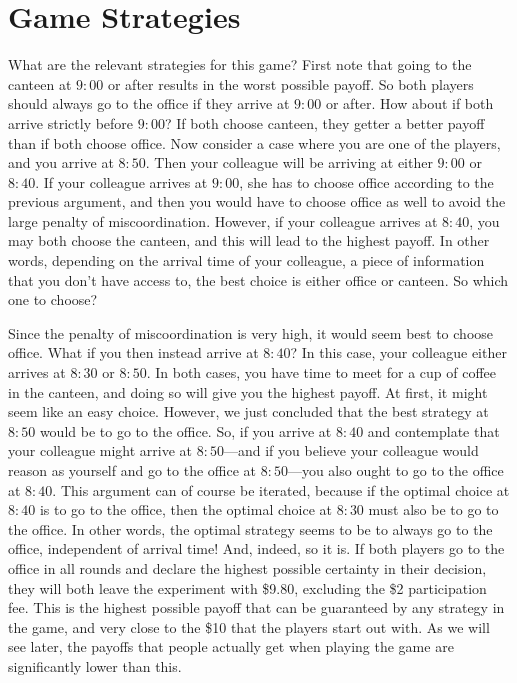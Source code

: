 \documentclass[twocolumn,a4paper,superscriptaddress,nofootinbib]{revtex4}
\begin{document}
\section{Game Strategies}
What are the relevant strategies for this game? First note that going to the canteen at $9{:}00$ or after results in the worst possible payoff. So both players should always go to the office if they arrive at $9{:}00$ or after. How about if both arrive strictly before $9{:}00$? If both choose canteen, they getter a better payoff than if both choose office. Now consider a case where you are one of the players, and you arrive at $8{:}50$. Then your colleague will be arriving at either $9{:}00$ or $8{:}40$. If your colleague arrives at $9{:}00$, she has to choose office according to the previous argument, and then you would have to choose office as well to avoid the large penalty of miscoordination. However, if your colleague arrives at $8{:}40$, you may both choose the canteen, and this will lead to the highest payoff. In other words, depending on the arrival time of your colleague, a piece of information that you don't have access to, the best choice is either office or canteen. So which one to choose?

Since the penalty of miscoordination is very high, it would seem best to choose office. What if you then instead  arrive at $8{:}40$? In this case, your colleague either arrives at $8{:}30$ or $8{:}50$. In both cases, you have time to meet for a cup of coffee in the canteen, and doing so will give you the highest payoff. At first, it might seem like an easy choice. However, we just concluded that the best strategy at $8{:}50$ would be to go to the office. So, if you arrive at $8{:}40$ and contemplate that your colleague might arrive at $8{:}50$---and if you believe your colleague would reason as yourself and go to the office at $8{:}50$---you also ought to go to the office at $8{:}40$. This argument can of course be iterated, because if the optimal choice at $8{:}40$ is to go to the office, then the optimal choice at $8{:}30$ must also be to go to the office. In other words, the optimal strategy seems to be to always go to the office, independent of arrival time! And, indeed, so it is. If both players go to the office in all rounds and declare the highest possible certainty in their decision, they will both leave the experiment with \$9.80, excluding the \$2 participation fee. This is the highest possible payoff that can be guaranteed by any strategy in the game, and very close to the \$10 that the players start out with. As we will see later, the payoffs that people actually get when playing the game are significantly lower than this.
\end{document}
